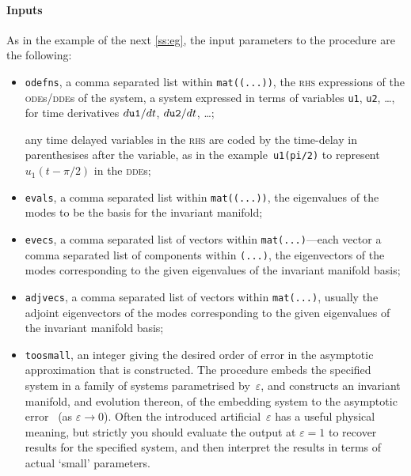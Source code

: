 \documentclass[11pt,a5paper]{article}
\def\eps{\varepsilon}
\begin{document}
\paragraph{Inputs}
As in the example of the next \cref{ss:eg}, the input
parameters to the procedure are the following:
\begin{itemize}

\item \verb|odefns|, a comma separated list within
\verb|mat((...))|, the \textsc{rhs} expressions of the
\textsc{ode}s/\textsc{dde}s of the system, a system
expressed in terms of variables \verb|u1|, \verb|u2|,
\ldots, for time derivatives \(\de t{\tt u1}\), \(\de t{\tt
u2}\), \ldots;

any time delayed variables in the \textsc{rhs} are coded by
the time-delay in parenthesises after the variable, as in
the example~\verb|u1(pi/2)| to represent~\(u_1(t-\pi/2)\) in
the \textsc{dde}s;

\item \verb|evals|, a comma separated list within
\verb|mat((...))|, the eigenvalues of the modes to be the
basis for the invariant manifold;

\item \verb|evecs|, a comma separated list of vectors within
\verb|mat(...)|---each vector a comma separated list of
components within \verb|(...)|, the eigenvectors of the
modes corresponding to the given eigenvalues of the
invariant manifold basis;

\item \verb|adjvecs|, a comma separated list of vectors
within \verb|mat(...)|, usually the adjoint eigenvectors of
the modes corresponding to the given eigenvalues of the
invariant manifold basis;  

\item \verb|toosmall|, an integer giving the desired order
of error in the asymptotic approximation that is
constructed.  The procedure embeds the specified system in a
family of systems parametrised by~\(\eps\), and constructs
an invariant manifold, and evolution thereon, of the
embedding system to the asymptotic error~\Ord{\eps^{\tt
toosmall}} (as \(\eps\to0\)). Often the introduced
artificial~\(\eps\) has a useful physical meaning, but
strictly you should  evaluate the output at \(\eps=1\) to
recover results for the specified system, and then interpret
the results in terms of actual `small' parameters.

\end{itemize}
\end{document}
